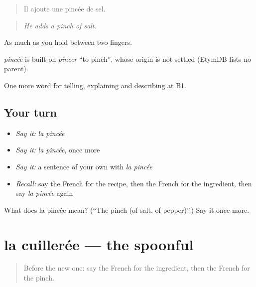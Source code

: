 \begin{quote}
Il ajoute une pincée de sel.
\end{quote}

\begin{quote}
\emph{He adds a pinch of salt.}
\end{quote}

As much as you hold between two fingers.

\begin{cousinweb}
\emph{pincée} is built on \emph{pincer} \textquotedblleft{}to pinch\textquotedblright{}, whose origin is not settled (EtymDB lists no parent).
\end{cousinweb}

\begin{grammarlens}[title={What you've built}]
One more word for telling, explaining and describing at B1.
\end{grammarlens}

\subsection*{Your turn}
\begin{itemize}
\raggedright
  \item \emph{Say it:} \emph{la pincée}
  \item \emph{Say it:} \emph{la pincée}, once more
  \item \emph{Say it:} a sentence of your own with \emph{la pincée}
  \item \emph{Recall:} say the French for the recipe, then the French for the ingredient, then say \emph{la pincée} again
\end{itemize}

\begin{tcolorbox}[breakable,colback=teal!4,colframe=teal!35!black,title={Before you move on}]
What does la pincée mean? (\textquotedblleft{}The pinch (of salt, of pepper)\textquotedblright{}.) Say it once more.
\end{tcolorbox}
\section[la cuillerée]{la cuillerée — the spoonful}

\label{lesson:FR-C327-cuilleree}



\begin{quote}
Before the new one: say the French for the ingredient, then the French for the pinch.
\end{quote}

